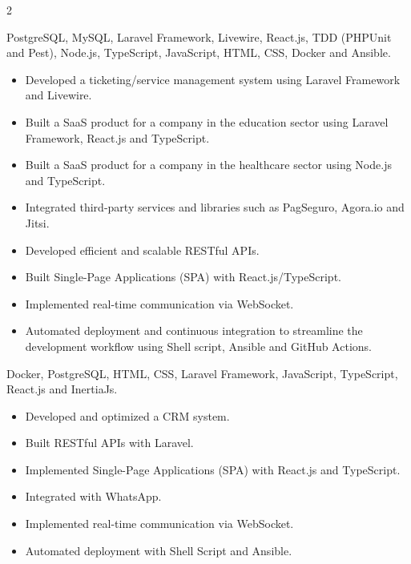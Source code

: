 \documentclass[10pt]{article}
\begin{document}
\begin{paracol}{2}
{\footnotesize\color{textgray}PostgreSQL, MySQL, Laravel Framework, Livewire, React.js, TDD (PHPUnit and Pest), Node.js, TypeScript, JavaScript, HTML, CSS, Docker and Ansible.\par\vspace{2pt}}
\begin{itemize}
  \item Developed a ticketing/service management system using Laravel Framework and Livewire.
  \item Built a SaaS product for a company in the education sector using Laravel Framework, React.js and TypeScript.
  \item Built a SaaS product for a company in the healthcare sector using Node.js and TypeScript.
  \item Integrated third-party services and libraries such as PagSeguro, Agora.io and Jitsi.
  \item Developed efficient and scalable RESTful APIs.
  \item Built Single-Page Applications (SPA) with React.js/TypeScript.
  \item Implemented real-time communication via WebSocket.
  \item Automated deployment and continuous integration to streamline the development workflow using Shell script, Ansible and GitHub Actions.
\end{itemize}

{\footnotesize\color{textgray}Docker, PostgreSQL, HTML, CSS, Laravel Framework, JavaScript, TypeScript, React.js and InertiaJs.\par\vspace{2pt}}
\begin{itemize}
  \item Developed and optimized a CRM system.
  \item Built RESTful APIs with Laravel.
  \item Implemented Single-Page Applications (SPA) with React.js and TypeScript.
  \item Integrated with WhatsApp.
  \item Implemented real-time communication via WebSocket.
  \item Automated deployment with Shell Script and Ansible.
\end{itemize}


\end{paracol}
\end{document}
